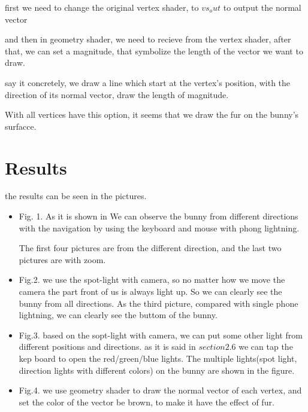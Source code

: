 \documentclass[acmtog]{acmart}
\begin{document}
first we need to change the original vertex shader, to \(vs_out\) to output the normal vector

and then in geometry shader, we need to recieve from the vertex shader,
 after that, we can set a magnitude, that symbolize the length of the vector we want to draw.

say it concretely, we draw a line which start at the vertex's position, with the 
direction of its normal vector, draw the length of magnitude.

With all vertices have this option, it seems that we draw the fur on the bunny's surfacce.


\section{Results}
the results can be seen in the pictures.

\begin{itemize}
\item Fig. 1. 
As it is shown in  We can observe the bunny from different directions with the navigation
by using the keyboard and mouse with phong lightning.

The first four pictures are from the different direction, and the last two pictures are with zoom.

\item Fig.2. we use the spot-light with camera, so no matter how we move the camera
the part front of us is always light up. So we can clearly see the bunny from all directions. As the third picture, compared with single 
phone lightning, we can clearly see the buttom of the bunny. 

\item Fig.3. based on the sopt-light with camera, we can put some other light from different positions and directions.
as it is said in \(section 2.6\) we can tap the kep board to open the red/green/blue
lights. The multiple lights(spot light, direction lights with different colors) on the bunny are shown in the figure.
 
\item Fig.4. we use geometry shader to draw the normal vector of each vertex, and set the color
of the vector be brown, to make it have the effect of fur. 

\end{itemize}
\end{document}
